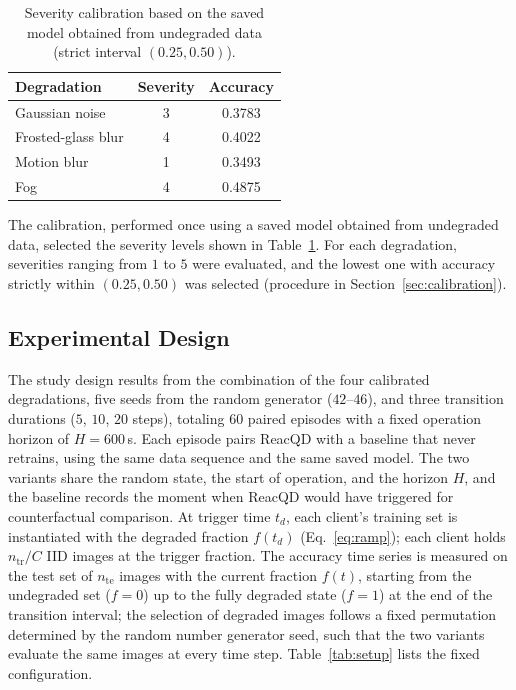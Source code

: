 \documentclass[conference]{IEEEtran}
\begin{document}
\begin{table}[!t]
\centering
\caption{Severity calibration based on the saved model obtained from undegraded data (strict interval $(0.25, 0.50)$).}
\label{tab:calibration}
\begin{tabular}{lcc}
\toprule
Degradation & Severity & Accuracy\\
\midrule
Gaussian noise & 3 & 0.3783\\
Frosted-glass blur & 4 & 0.4022\\
Motion blur & 1 & 0.3493\\
Fog & 4 & 0.4875\\
\bottomrule
\end{tabular}
\end{table}
The calibration, performed once using a saved model obtained from undegraded data, selected the severity levels shown in Table~\ref{tab:calibration}. For each degradation, severities ranging from $1$ to $5$ were evaluated, and the lowest one with accuracy strictly within $(0.25, 0.50)$ was selected (procedure in Section~\ref{sec:calibration}).

\subsection{Experimental Design}
The study design results from the combination of the four calibrated degradations, five seeds from the random generator ($42$--$46$), and three transition durations ($5$, $10$, $20$ steps), totaling 60 paired episodes with a fixed operation horizon of $H=600$\,s. Each episode pairs ReacQD with a baseline that never retrains, using the same data sequence and the same saved model. The two variants share the random state, the start of operation, and the horizon $H$, and the baseline records the moment when ReacQD would have triggered for counterfactual comparison. At trigger time $t_d$, each client’s training set is instantiated with the degraded fraction $f(t_d)$ (Eq.~\eqref{eq:ramp}); each client holds $n_{\mathrm{tr}}/C$ IID images at the trigger fraction. The accuracy time series is measured on the test set of $n_{\mathrm{te}}$ images with the current fraction $f(t)$, starting from the undegraded set ($f=0$) up to the fully degraded state ($f=1$) at the end of the transition interval; the selection of degraded images follows a fixed permutation determined by the random number generator seed, such that the two variants evaluate the same images at every time step. Table~\ref{tab:setup} lists the fixed configuration.
\end{document}
